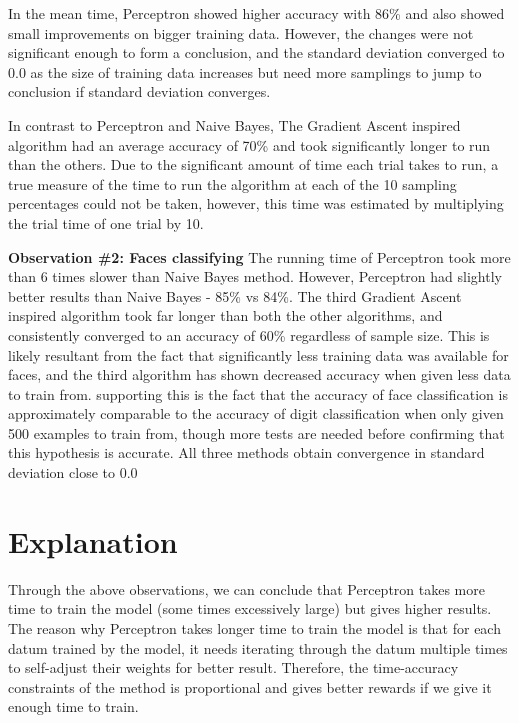 \documentclass{article}
\begin{document}
In the mean time, Perceptron showed higher accuracy with 86\% and also showed small improvements on bigger training data. However, the changes were not significant enough to form a conclusion, and the standard deviation converged to 0.0 as the size of training data increases but need more samplings to jump to conclusion if standard deviation converges.

In contrast to Perceptron and Naive Bayes, The Gradient Ascent inspired algorithm had an average accuracy of 70\% and took significantly longer to run than the others. Due to the significant amount of time each trial takes to run, a true measure of the time to run the algorithm at each of the 10 sampling percentages could not be taken, however, this time was estimated by multiplying the trial time of one trial by 10. 

\textbf{Observation \#2: Faces classifying}
The running time of Perceptron took more than 6 times slower than Naive Bayes method. However, Perceptron had slightly better results than Naive Bayes - 85\% vs 84\%. The third Gradient Ascent inspired algorithm took far longer than both the other algorithms, and consistently converged to an accuracy of 60\% regardless of sample size. This is likely resultant from the fact that significantly less training data was available for faces, and the third algorithm has shown decreased accuracy when given less data to train from. supporting this is the fact that the accuracy of face classification is approximately comparable to the accuracy of digit classification when only given 500 examples to train from, though more tests are needed before confirming that this hypothesis is accurate. All three methods obtain convergence in standard deviation close to 0.0

\section{Explanation}
Through the above observations, we can conclude that Perceptron takes more time to train the model (some times excessively large) but gives higher results. The reason why Perceptron takes longer time to train the model is that for each datum trained by the model, it needs iterating through the datum multiple times to self-adjust their weights for better result. Therefore, the time-accuracy constraints of the method is proportional and gives better rewards if we give it enough time to train.
\end{document}
